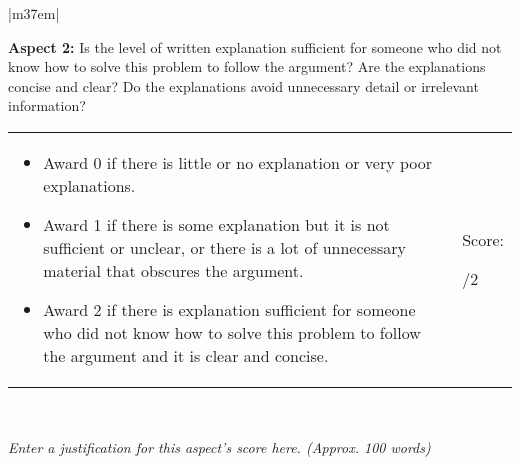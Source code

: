 \documentclass[article,11pt]{book}
\begin{document}
\begin{tabular}{|m{37em}|}
    \hline
    
    \textbf{Aspect 2:} Is the level of written explanation sufficient for someone who did not know how to solve this problem to follow the argument? Are the explanations concise and clear? Do the explanations avoid unnecessary detail or irrelevant information?  
    \\ \hline
    
    \begin{tabular}{m{32em}|m{5em}}
      \begin{itemize}
          \item Award 0 if there is little or no explanation or very poor explanations.
          \item Award 1 if there is some explanation but it is not sufficient or unclear, or there is a lot of unnecessary material that obscures the argument.
          \item Award 2 if there is explanation sufficient for someone who did not know how to solve this problem to follow the argument and it is clear and concise.
      \end{itemize}  
      &  
      Score: 
      
      \medskip
      {\huge  /2}
    \end{tabular} 
    \\ \hline
    
    \textit{Enter a justification for this aspect’s score here. (Approx. 100 words)}
    \\ \hline
\end{tabular}

\bigskip

\end{document}
